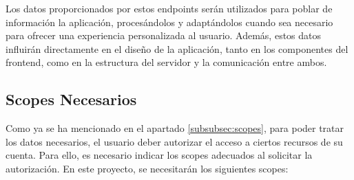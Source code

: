 



Los datos proporcionados por estos endpoints serán utilizados para poblar de información la aplicación, procesándolos y adaptándolos cuando sea necesario para ofrecer una experiencia personalizada al usuario. Además, estos datos influirán directamente en el diseño de la aplicación, tanto en los componentes del frontend, como en la estructura del servidor y la comunicación entre ambos.

\subsection{Scopes Necesarios}

Como ya se ha mencionado en el apartado \ref{subsubsec:scopes}, para poder tratar los datos necesarios, el usuario deber autorizar el acceso a ciertos recursos de su cuenta. Para ello, es necesario indicar los scopes adecuados al solicitar la autorización. En este proyecto, se necesitarán los siguientes scopes:

